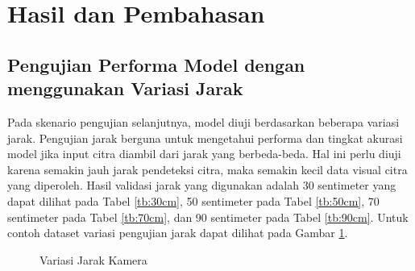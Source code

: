 \section{Hasil dan Pembahasan}
\label{sec:hasildanpembahasan}

\subsection{Pengujian Performa Model dengan menggunakan Variasi Jarak}

Pada skenario pengujian selanjutnya, model diuji berdasarkan beberapa variasi jarak. Pengujian jarak berguna untuk mengetahui performa dan tingkat akurasi model jika input citra diambil dari jarak yang berbeda-beda. Hal ini perlu diuji karena semakin jauh jarak pendeteksi citra, maka semakin kecil data visual citra yang diperoleh. Hasil validasi jarak yang digunakan adalah 30 sentimeter yang dapat dilihat pada Tabel \ref{tb:30cm}, 50 sentimeter pada Tabel \ref{tb:50cm}, 70 sentimeter pada Tabel \ref{tb:70cm}, dan 90 sentimeter pada Tabel \ref{tb:90cm}. Untuk contoh dataset variasi pengujian jarak dapat dilihat pada Gambar \ref{fig:Variasi Jarak Kamera}.

\begin{figure}[H]
  \centering
    \hfil 

    \hfil

  \caption{Variasi Jarak Kamera}
  \label{fig:Variasi Jarak Kamera}
\end{figure}

